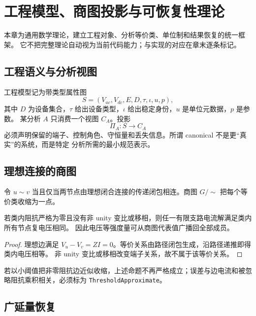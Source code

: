 \section{工程模型、商图投影与可恢复性理论}

\begin{theorynote}
本章为通用数学理论，建立工程对象、分析等价类、单位制和结果恢复的统一框架。
它不把完整理论自动视为当前代码能力；与实现的对应在章末逐条标记。
\end{theorynote}

\subsection{工程语义与分析视图}

工程模型记为带类型属性图
\begin{equation}
S=(V_{ac},V_{dc},E,D,\tau,\iota,u,p),
\end{equation}
其中 $D$ 为设备集合，$\tau$ 给出设备类型，$\iota$ 给出稳定身份，$u$ 是单位元数据，$p$ 是参数。
某分析 $A$ 只消费一个视图 $C_A$。投影
\begin{equation}
\Pi_A:S\longrightarrow C_A
\end{equation}
必须声明保留的端子、控制角色、守恒量和丢失信息。所谓 canonical 不是更“真实”的系统，而是特定
分析所需的最小规范表示。

\subsection{理想连接的商图}

令 $u\sim v$ 当且仅当两节点由理想闭合连接的传递闭包相连。商图 $G/{\sim}$ 把每个等价类收缩为一点。

\begin{proposition}[理想连接下的强度量恢复]
若类内阻抗严格为零且没有非 unity 变比或移相，则任一有限支路电流解满足类内所有节点复电压相同。
因此电压等强度量可从商图代表值广播回全部成员。
\end{proposition}
\begin{proof}
理想边满足 $V_u-V_v=ZI=0$。等价关系由路径闭包生成，沿路径递推即得类内电压相等。
非 unity 变比或移相改变端子关系，故不属于该等价关系。
\end{proof}

若以小阈值把非零阻抗边近似收缩，上述命题不再严格成立；误差与边电流和被忽略阻抗乘积相关，必须标为
\texttt{ThresholdApproximate}。

\subsection{广延量恢复}

